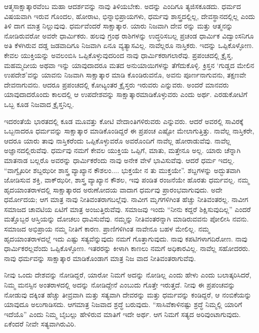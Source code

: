 ಆತ್ಮಸಾಕ್ಷಾತ್ಕಾರವೆಂಬ ಮಹಾ ಆದರ್ಶವನ್ನು ನಾವು ತಿಳಿಯಬೇಕು. ಅದನ್ನು ಎಂದಿಗೂ ತ್ಯಜಿಸಕೂಡದು. ಧರ್ಮದ ವಿಷಯವಾಗಿ ಇರುವ ಗೊಂದಲ, ಹೋರಾಟ, ಭಿನ್ನಾಭಿಪ್ರಾಯಗಳು, ಧರ್ಮವು ಶಾಸ್ತ್ರದಲ್ಲಿಲ್ಲ, ದೇವಸ್ಥಾನದಲ್ಲಿಲ್ಲ ಎಂದು ತಿಳಿ ದಾಗ ಮಾತ್ರ ನಿಲ್ಲುವುವು. ಧರ್ಮವೆಂದರೆ ಸಾಕ್ಷಾತ್ಕಾರ. ಯಾರು ನಿಜವಾಗಿ ದೇವ ರನ್ನು ಮತ್ತು ಆತ್ಮನನ್ನು ನೋಡಿರುವರೋ ಅವರೇ ಧಾರ್ಮಿಕರು. ಹಲವು ಗ್ರಂಥ ರಾಶಿಗಳನ್ನು ಉದ್ಧರಿಸಬಲ್ಲ ಪ್ರಚಂಡ ಧಾರ್ಮಿಕ ವಿದ್ವಾಂಸನಿಗೂ ಅತಿ ಕೆಳಗಿರುವ ದಡ್ಡ ಜಡವಾದಿಗೂ ನಿಜವಾಗಿ ಏನೂ ವ್ಯತ್ಯಾಸವಿಲ್ಲ. ನಾವೆಲ್ಲರೂ ನಾಸ್ತಿಕರು. ಇದನ್ನು ಒಪ್ಪಿಕೊಳ್ಳೋಣ. ಕೇವಲ ಯುಕ್ತಿಯನ್ನು ಅವಲಂಬಿಸಿ ಒಪ್ಪಿಕೊಳ್ಳುವುದರಿಂದ ನಾವು ಧಾರ್ಮಿಕರಾಗಲಾರೆವು. ಪ್ರಪಂಚದಲ್ಲಿ ಕ್ರೈಸ್ತ, ಮಹಮ್ಮದೀಯ ಅಥವಾ ಇನ್ನು ಯಾವುದಾದರೂ ಮತದ ಅನುಯಾಯಿಗಳನ್ನು ತೆಗೆದುಕೊಳ್ಳಿ. ಕ್ರಿಸ್ತನ ‘ಗುಡ್ಡದ ಮೇಲಿನ ಉಪದೇಶ’ವನ್ನು ಯಾವನು ನಿಜವಾಗಿ ಸಾಕ್ಷಾತ್ಕಾರ ಮಾಡಿ ಕೊಂಡಿರುವನೊ, ಅವನು ಪೂರ್ಣನಾಗುವನು, ತಕ್ಷಣವೇ ದೇವನಾಗುವನು. ಆದರೂ ಪ್ರಪಂಚದಲ್ಲಿ ಕೋಟ್ಯಂತರ ಕ್ರೈಸ್ತರು ಇರುವರು ಎನ್ನುವರು. ಅಂದರೆ ಮಾನವರು ಯಾವುದಾದರೊಂದು ಕಾಲದಲ್ಲಿ ಆ ಉಪದೇಶವನ್ನು ಸಾಕ್ಷಾತ್ಕಾರಮಾಡಿಕೊಳ್ಳುವರು ಎಂದು ಅರ್ಥ. ಎರಡುಕೋಟಿಗೆ ಒಬ್ಬ ಕೂಡ ನಿಜವಾದ ಕ್ರೈಸ್ತನಿಲ್ಲ.

ಇದರಂತೆಯೆ ಭಾರತದಲ್ಲಿ ಕೂಡ ಮೂವತ್ತು ಕೋಟಿ ವೇದಾಂತಿಗಳಿರುವರು ಎನ್ನುವರು. ಆದರೆ ಅವರಲ್ಲಿ ಸಾವಿರಕ್ಕೆ ಒಬ್ಬನಾದರೂ ಧರ್ಮವನ್ನು ಸಾಕ್ಷಾತ್ಕಾರ ಮಾಡಿಕೊಂಡಿದ್ದರೆ ಈ ಪ್ರಪಂಚ ಎಷ್ಟೋ ಮೇಲಾಗುತ್ತಿತ್ತು. ನಾವೆಲ್ಲ ನಾಸ್ತಿಕರೇ, ಆದರೂ ಯಾರು ತಾವು ನಾಸ್ತಿಕರೆಂದು ಒಪ್ಪಿಕೊಳ್ಳುವರೊ ಅವರೊಂದಿಗೆ ನಾವೆಲ್ಲ ಹೋರಾಡುವೆವು. ನಾವೆಲ್ಲ ಅಜ್ಞಾನದಲ್ಲಿರುವೆವು. ಧರ್ಮವು ನಮಗೆ ಕೇವಲ ಯುಕ್ತಿಯ ಒಪ್ಪಿಗೆ, ಮಾತು, ಮತ್ತೇನೂ ಅಲ್ಲ. ಯಾರು ಚೆನ್ನಾಗಿ ಮಾತನಾಡ ಬಲ್ಲರೊ ಅವರನ್ನು ಧಾರ್ಮಿಕರೆಂದು ನಾವು ಅನೇಕ ವೇಳೆ ಭಾವಿಸುವೆವು. ಆದರೆ ಧರ್ಮ ಇದಲ್ಲ. “ವಾಗ್ವೈಖರೀ ಶಬ್ದಝರೀ ಶಾಸ್ತ್ರ ವ್ಯಾಖ್ಯಾನ ಕೌಶಲಂ.... ಭುಕ್ತಯೇ ನ ತು ಮುಕ್ತಯೇ”. ಶಬ್ದಗಳನ್ನು ಅದ್ಭುತವಾಗಿ ಜೋಡಿಸುವ ಶಕ್ತಿ, ವಾಕ್​ಝರೀ, ಶಾಸ್ತ್ರ ವ್ಯಾಖ್ಯಾನ ಕೌಶಲ, ಇವು ಪಂಡಿತ ರಂಜನೆಯೇ ಹೊರತು ಧರ್ಮವಲ್ಲ. ನಮ್ಮ ಹೃದಯಾಂತರಾಳದಲ್ಲಿ ಸಾಕ್ಷಾತ್ಕಾರದ ಅರುಣೋದಯ ವಾದಾಗ ಧರ್ಮವು ಪ್ರಾರಂಭವಾಗುವುದು. ಅದೇ ಧರ್ಮೋದಯ; ಆಗ ಮಾತ್ರ ನಾವು ನೀತಿವಂತರಾಗಬಲ್ಲೆವು. ನಾವೀಗ ಮೃಗಗಳಿಗಿಂತ ಹೆಚ್ಚು ನೀತಿವಂತರಲ್ಲ. ನಾವೀಗ ಸಮಾಜದ ಚಾವಟಿಯ ಏಟಿಗೆ ಮಾತ್ರ ಅಂಜುತ್ತಿರುವೆವು. ಸಮಾಜವು ಇಂದು “ನೀನು ಕದ್ದರೆ ಶಿಕ್ಷಿಸುವುದಿಲ್ಲ” ಎಂದರೆ ಮತ್ತೊಬ್ಬರ ಆಸ್ತಿಯನ್ನು ದೋಚಲು ಧಾವಿಸುವೆವು. ನಮ್ಮನ್ನು ನೀತಿವಂತರನ್ನಾಗಿ ಮಾಡಿರುವವನು ಪೋಲೀಸಿ ನವನು. ಸಮಾಜದ ಅಭಿಪ್ರಾಯ ನಮ್ಮ ನೀತಿಗೆ ಕಾರಣ. ಪ್ರಾಣಿಗಳಿಗಿಂತ ನಾವೇನೂ ಬಹಳ ಮೇಲಿಲ್ಲ. ನಮ್ಮ ಹೃದಯಾಂತರಾಳದಲ್ಲೆ ಇದು ಎಷ್ಟು ಸತ್ಯವೆನ್ನುವುದು ನಮಗೆ ಗೊತ್ತಾಗುವುದು. ನಾವು ಕಪಟಿಗಳಾಗದಿರೋಣ. ನಾವು ಧಾರ್ಮಿಕರಲ್ಲವೆಂದು ಒಪ್ಪಿಕೊಳ್ಳೋಣ. ಇತರರನ್ನು ಕೀಳಾಗಿ ಕಾಣಲು ನಮಗೆ ಅಧಿಕಾರವಿಲ್ಲ. ನಾವೆಲ್ಲ ಸಹೋದರರು. ನಾವು ಧರ್ಮವನ್ನು ಸಾಕ್ಷಾತ್ಕಾರ ಮಾಡಿಕೊಂಡಾಗ ಮಾತ್ರ ನಿಜ ವಾದ ನೀತಿವಂತರಾಗುವೆವು.

ನೀವು ಒಂದು ದೇಶವನ್ನು ನೋಡಿದ್ದರೆ, ಯಾರೋ ನಿಮಗೆ ಅದನ್ನು ನೋಡಿಲ್ಲ ಎಂದು ಹೇಳು ಎಂದು ಬಲಾತ್ಕರಿಸಿದರೆ, ನಿಮ್ಮ ಮನಸ್ಸಿನ ಅಂತರಾಳದಲ್ಲಿ ಅದನ್ನು ನೋಡಿದ್ದೇನೆ ಎಂಬುದು ಗೊತ್ತೇ ಇರುತ್ತದೆ. ನೀವು ಈ ಪ್ರಪಂಚವನ್ನು ನೋಡುವು ದಕ್ಕಿಂತ ಹೆಚ್ಚು ತೀವ್ರವಾಗಿ ಮತ್ತು ಸತ್ಯವಾಗಿ ದೇವರನ್ನು ಮತ್ತು ಧರ್ಮವನ್ನು ಕಂಡಿದ್ದರೆ, ಆ ನಂಬಿಕೆಯನ್ನು ಯಾವುದೂ ಅಲುಗಾಡಿಸದು. ಆಗಮಾತ್ರ ನಿಜವಾದ ಶ್ರದ್ಧೆ ಬರುವುದು. “ಸಾಸಿವೆಕಾಳಿನಷ್ಟು ಶ್ರದ್ಧೆ ನಿಮ್ಮಲ್ಲಿ ಯಾರಿಗೆ ಇದೆಯೊ” ಎಂದು ನಿಮ್ಮ ಬೈಬಲ್ಲು ಹೇಳಿರುವ ಮಾತಿಗೆ ಇದೇ ಅರ್ಥ. ಆಗ ನಿಮಗೆ ಸತ್ಯದ ಅರಿವುಂಟಾಗುವುದು. ಏಕೆಂದರೆ ನೀವೇ ಸತ್ಯವಾಗಿರುವಿರಿ.

